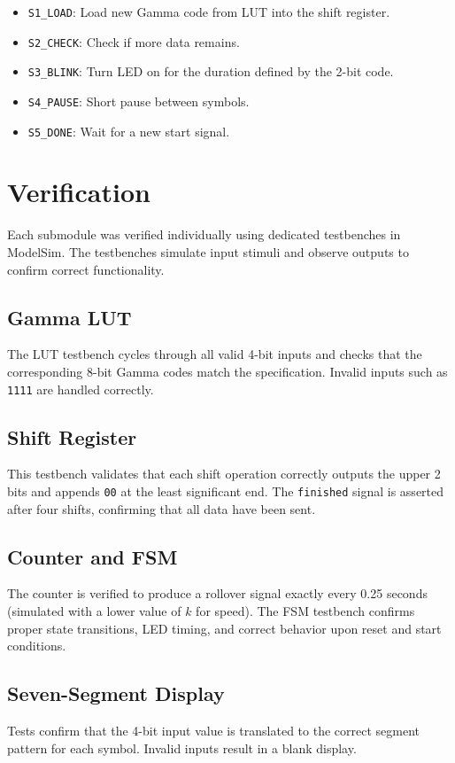 \documentclass[conference]{IEEEtran}
\begin{document}
\begin{itemize}
  \item \texttt{S1\_LOAD}: Load new Gamma code from LUT into the shift register.
  \item \texttt{S2\_CHECK}: Check if more data remains.
  \item \texttt{S3\_BLINK}: Turn LED on for the duration defined by the 2-bit code.
  \item \texttt{S4\_PAUSE}: Short pause between symbols.
  \item \texttt{S5\_DONE}: Wait for a new start signal.
\end{itemize}

\section{Verification}
Each submodule was verified individually using dedicated testbenches in ModelSim. The testbenches simulate input stimuli and observe outputs to confirm correct functionality.

\subsection{Gamma LUT}
The LUT testbench cycles through all valid 4-bit inputs and checks that the corresponding 8-bit Gamma codes match the specification. Invalid inputs such as \texttt{1111} are handled correctly.

\subsection{Shift Register}
This testbench validates that each shift operation correctly outputs the upper 2 bits and appends \texttt{00} at the least significant end. The \texttt{finished} signal is asserted after four shifts, confirming that all data have been sent.

\subsection{Counter and FSM}
The counter is verified to produce a rollover signal exactly every 0.25 seconds (simulated with a lower value of $k$ for speed). The FSM testbench confirms proper state transitions, LED timing, and correct behavior upon reset and start conditions.

\subsection{Seven-Segment Display}
Tests confirm that the 4-bit input value is translated to the correct segment pattern for each symbol. Invalid inputs result in a blank display.
\end{document}
